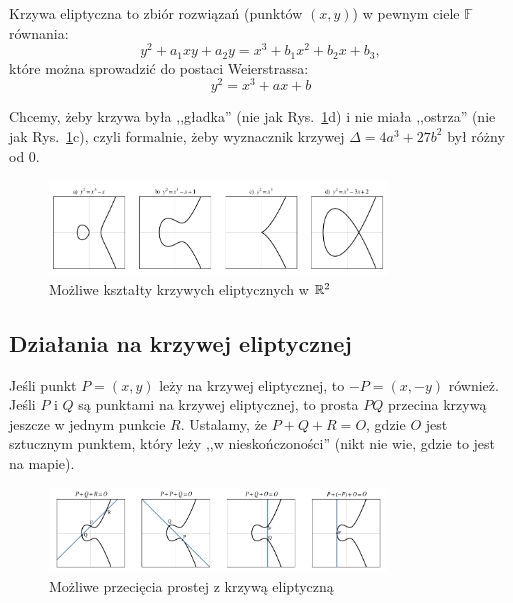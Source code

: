 \begin{definition}
    Krzywa eliptyczna to zbiór rozwiązań (punktów \( (x, y) \)) w pewnym ciele \( \mathbb{F} \) równania:
    \[
        y^2 + a_1xy + a_2y = x^3 + b_1x^2 + b_2x + b_3,
    \]
    które można sprowadzić do postaci Weierstrassa:
    \[
        y^2 = x^3 + ax + b
    \]
\end{definition}

Chcemy, żeby krzywa była ,,gładka'' (nie jak Rys.~\ref{fig:elliptic_curves}d) i nie miała ,,ostrza'' (nie jak Rys.~\ref{fig:elliptic_curves}c), czyli formalnie, żeby wyznacznik krzywej \( \Delta = 4a^3 + 27b^2 \) był różny od 0.

\begin{figure}[H]
\centering
    \includegraphics[width=0.8\textwidth]{img/elliptic_curves}
    \caption{Możliwe kształty krzywych eliptycznych w \( \mathbb{R}^2 \)}
    \label{fig:elliptic_curves}
\end{figure}

\subsection{Działania na krzywej eliptycznej}
Jeśli punkt \( P = (x, y) \) leży na krzywej eliptycznej, to \( -P = (x, -y) \) również.
Jeśli \( P \) i \( Q \) są punktami na krzywej eliptycznej, to prosta \( PQ \) przecina krzywą jeszcze w jednym punkcie \( R \).
Ustalamy, że \( P + Q + R = O \), gdzie \( O \) jest sztucznym punktem, który leży ,,w nieskończoności'' (nikt nie wie, gdzie to jest na mapie).

\begin{figure}[H]
\centering
    \includegraphics[width=0.8\textwidth]{img/elliptic_curves_lines}
    \caption{Możliwe przecięcia prostej z krzywą eliptyczną}
    \label{fig:elliptic_lines}
\end{figure}

